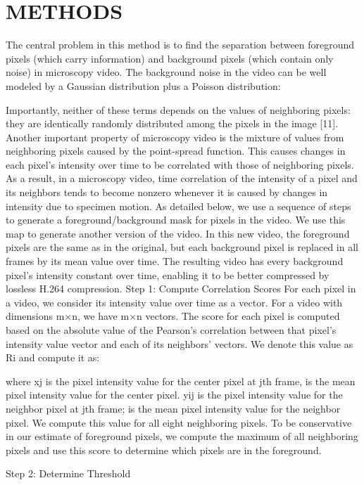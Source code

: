 \section{METHODS}
The central problem in this method is to find the separation between foreground pixels (which carry information) and background pixels (which contain only noise) in microscopy video.
The background noise in the video can be well modeled by a Gaussian distribution plus a Poisson distribution:

Importantly, neither of these terms depends on the values of neighboring pixels: they are identically randomly distributed among the pixels in the image [11].
Another important property of microscopy video is the mixture of values from neighboring pixels caused by the point-spread function. This causes changes in each pixel’s intensity over time to be correlated with those of neighboring pixels.  As a result, in a microscopy video, time correlation of the intensity of a pixel and its neighbors tends to become nonzero whenever it is caused by changes in intensity due to specimen motion.
As detailed below, we use a sequence of steps to generate a foreground/background mask for pixels in the video.  We use this map to generate another version of the video. In this new video, the foreground pixels are the same as in the original, but each background pixel is replaced in all frames by its mean value over time. The resulting video has every background pixel’s intensity constant over time, enabling it to be better compressed by lossless H.264 compression.
Step 1: Compute Correlation Scores
For each pixel in a video, we consider its intensity value over time as a vector. For a video with dimensions m×n, we have m×n vectors. The score for each pixel is computed based on the absolute value of the Pearson’s correlation between that pixel’s intensity value vector and each of its neighbors’ vectors. We denote this value as Ri and compute it as:


where xj is the pixel intensity value for the center pixel at jth frame,  is the mean pixel intensity value for the center pixel. yij is the pixel intensity value for the neighbor pixel at jth frame;  is the mean pixel intensity value for the neighbor pixel.
We compute this value for all eight neighboring pixels.  To be conservative in our estimate of foreground pixels, we compute the maximum of all neighboring pixels and use this score to determine which pixels are in the foreground.

Step 2: Determine Threshold

